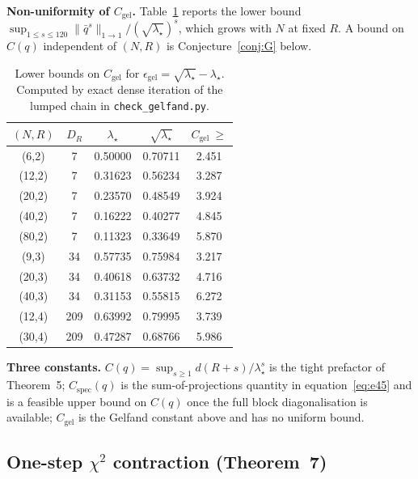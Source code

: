 \documentclass[twoside,11pt]{article}
\begin{document}
\textbf{Non-uniformity of $C_{\mathrm{gel}}$.}
Table~\ref{tab:S4} reports the lower bound
$\sup_{1\le s\le120}\|\bar q^{s}\|_{1\to1}/(\sqrt{\lambda_\star})^{s}$, which grows
with $N$ at fixed $R$. A bound on $C(q)$
independent of $(N,R)$ is Conjecture~\ref{conj:G} below.

\begin{table}[htbp]
\centering
\begin{tabular}{ccccc}
\toprule
$(N,R)$ & $D_R$ & $\lambda_\star$ & $\sqrt{\lambda_\star}$ & $C_{\mathrm{gel}}\ \ge$ \\
\midrule
(6,2) & 7 & 0.50000 & 0.70711 & 2.451 \\
(12,2) & 7 & 0.31623 & 0.56234 & 3.287 \\
(20,2) & 7 & 0.23570 & 0.48549 & 3.924 \\
(40,2) & 7 & 0.16222 & 0.40277 & 4.845 \\
(80,2) & 7 & 0.11323 & 0.33649 & 5.870 \\
(9,3) & 34 & 0.57735 & 0.75984 & 3.217 \\
(20,3) & 34 & 0.40618 & 0.63732 & 4.716 \\
(40,3) & 34 & 0.31153 & 0.55815 & 6.272 \\
(12,4) & 209 & 0.63992 & 0.79995 & 3.739 \\
(30,4) & 209 & 0.47287 & 0.68766 & 5.986 \\
\bottomrule
\end{tabular}
\caption{Lower bounds on $C_{\mathrm{gel}}$ for $\epsilon_{\mathrm{gel}}=\sqrt{\lambda_\star}-\lambda_\star$.
Computed by exact dense iteration of the lumped chain in
\texttt{check\_gelfand.py}.}
\label{tab:S4}

\end{table}

\textbf{Three constants.} $C(q)=\sup_{s\ge1}d(R+s)/\lambda_\star^{s}$ is the
tight prefactor of Theorem~5; $C_{\mathrm{spec}}(q)$ is the
sum-of-projections quantity in equation~\eqref{eq:e45} and is a
feasible upper bound on $C(q)$ once the full block diagonalisation is
available; $C_{\mathrm{gel}}$ is the Gelfand constant above and has no uniform bound.

\subsection{\texorpdfstring{One-step $\chi^2$ contraction (Theorem~7)}{One-step chi squared contraction (Theorem 7)}}
\label{sec:S5}
\end{document}
